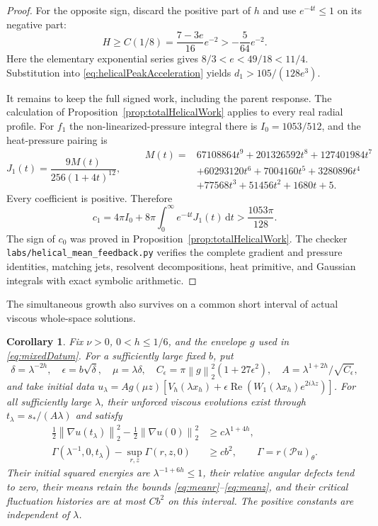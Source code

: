 \documentclass[11pt]{article}
\newtheorem{corollary}[theorem]{Corollary}
\theoremstyle{remark}
\newcommand{\PP}{\mathcal P}
\newcommand{\dd}{\,\mathrm d}
\newcommand{\norm}[1]{\left\lVert#1\right\rVert}
\begin{document}
\begin{proof}
For the opposite sign, discard the positive part of $h$ and use
$e^{-4t}\leq1$ on its negative part:
\[
 H\geq C(1/8)=\frac{7-3e}{16}e^{-2}
                             >-\frac5{64}e^{-2}.
\]
Here the elementary exponential series gives
$8/3<e<49/18<11/4$. Substitution into
\eqref{eq:helicalPeakAcceleration} yields
$d_1>105/(128e^3)$.

It remains to keep the full signed work, including the parent response.
The calculation of Proposition~\ref{prop:totalHelicalWork} applies
to every real radial profile. For $f_1$ the non-linearized-pressure
integral there is $I_0=1053/512$, and the heat-pressure pairing is
\[
 J_1(t)=\frac{9M(t)}{256(1+4t)^{12}},
 \qquad
 \begin{aligned}
 M(t)={}&67108864t^9+201326592t^8+127401984t^7\\
       &+60293120t^6+7004160t^5+3280896t^4\\
       &+77568t^3+51456t^2+1680t+5.
 \end{aligned}
\]
Every coefficient is positive. Therefore
\[
 c_1=4\pi I_0+8\pi\int_0^\infty e^{-4t}J_1(t)\dd t
                                          >\frac{1053\pi}{128}.
\]
The sign of $c_0$ was proved in
Proposition~\ref{prop:totalHelicalWork}. The checker
\texttt{labs/helical\_mean\_feedback.py} verifies the complete gradient
and pressure identities, matching jets, resolvent decompositions, heat
primitive, and Gaussian integrals with exact symbolic arithmetic.
\end{proof}

The simultaneous growth also survives on a common short interval of
actual viscous whole-space solutions.

\begin{corollary}\label{cor:helicalSimultaneous}
Fix $\nu>0$, $0<h\leq1/6$, and the envelope $g$ used in
\eqref{eq:mixedDatum}. For a sufficiently large fixed $b$, put
\[
 \delta=\lambda^{-2h},\quad \epsilon=b\sqrt\delta,\quad
 \mu=\lambda\delta,\quad
 C_\epsilon=\pi\norm g_2^2(1+27\epsilon^2),\quad
 A=\lambda^{1+2h}/\sqrt{C_\epsilon},
\]
and take initial data
$u_\lambda=A g(\mu z)[V_h(\lambda x_h)+
 \epsilon\operatorname{Re}(W_1(\lambda x_h)e^{2i\lambda z})]$.
For all sufficiently large $\lambda$, their unforced viscous
evolutions exist through $t_\lambda=s_*/(A\lambda)$ and satisfy
\begin{align*}
 \tfrac12\norm{\nabla u(t_\lambda)}_2^2
       -\tfrac12\norm{\nabla u(0)}_2^2
                              &\geq c\lambda^{1+4h},\\
 \Gamma(\lambda^{-1},0,t_\lambda)-\sup_{r,z}\Gamma(r,z,0)
                              &\geq c b^2,
       \qquad \Gamma=r(\PP u)_\theta .
\end{align*}
Their initial squared energies are $\lambda^{-1+6h}\leq1$,
their relative angular defects tend to zero, their means retain the
bounds \eqref{eq:meanr}--\eqref{eq:meanz}, and their critical
fluctuation histories are at most $Cb^2$ on this interval.
The positive constants are independent of $\lambda$.
\end{corollary}
\end{document}
